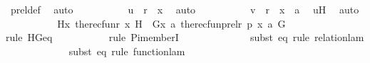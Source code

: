 \begin{isabellebody}
\ prel{\isacharunderscore}{\kern0pt}def\ \isamarkupfalse%
\ auto\ \isanewline
\ \ \ \ \ \ \isamarkupfalse%
\ \isamarkupfalse%
\ {\isachardoublequoteopen}u\ {\isasymin}\ r\ {\isacharminus}{\kern0pt}{\isacharbackquote}{\kern0pt}{\isacharbackquote}{\kern0pt}\ {\isacharbraceleft}{\kern0pt}x{\isacharbraceright}{\kern0pt}{\isachardoublequoteclose}\ \isamarkupfalse%
\ auto\ \isanewline
\ \ \ \ \ \ \isamarkupfalse%
\ \isamarkupfalse%
\ {\isachardoublequoteopen}v\ {\isasymin}\ r\ {\isacharminus}{\kern0pt}{\isacharbackquote}{\kern0pt}{\isacharbackquote}{\kern0pt}\ {\isacharbraceleft}{\kern0pt}x{\isacharbraceright}{\kern0pt}\ {\isasymtimes}\ {\isacharbraceleft}{\kern0pt}a{\isacharbraceright}{\kern0pt}{\isachardoublequoteclose}\ \isamarkupfalse%
\ uH\ \isamarkupfalse%
\ auto\isanewline
\ \ \ \ \isamarkupfalse%
\isanewline
\isanewline
\ \ \ \ \isamarkupfalse%
\ {\isachardoublequoteopen}H{\isacharparenleft}{\kern0pt}x{\isacharcomma}{\kern0pt}\ the{\isacharunderscore}{\kern0pt}recfun{\isacharparenleft}{\kern0pt}r{\isacharcomma}{\kern0pt}\ x{\isacharcomma}{\kern0pt}\ H{\isacharparenright}{\kern0pt}{\isacharparenright}{\kern0pt}\ {\isacharequal}{\kern0pt}\ G{\isacharparenleft}{\kern0pt}{\isacharless}{\kern0pt}x{\isacharcomma}{\kern0pt}\ a{\isachargreater}{\kern0pt}{\isacharcomma}{\kern0pt}\ the{\isacharunderscore}{\kern0pt}recfun{\isacharparenleft}{\kern0pt}prel{\isacharparenleft}{\kern0pt}r{\isacharcomma}{\kern0pt}\ p{\isacharparenright}{\kern0pt}{\isacharcomma}{\kern0pt}\ {\isacharless}{\kern0pt}x{\isacharcomma}{\kern0pt}\ a{\isachargreater}{\kern0pt}{\isacharcomma}{\kern0pt}\ G{\isacharparenright}{\kern0pt}{\isacharparenright}{\kern0pt}{\isachardoublequoteclose}\ \isanewline
\ \ \ \ \ \ \isamarkupfalse%
{\isacharparenleft}{\kern0pt}rule\ HGeq{\isacharparenright}{\kern0pt}\isanewline
\ \ \ \ \ \ \ \ \ \ \isamarkupfalse%
{\isacharparenleft}{\kern0pt}rule\ Pi{\isacharunderscore}{\kern0pt}memberI{\isacharparenright}{\kern0pt}\isanewline
\ \ \ \ \ \ \ \ \ \ \ \ \ \isamarkupfalse%
{\isacharparenleft}{\kern0pt}subst\ eq{}{\isacharcomma}{\kern0pt}\ rule\ relation{\isacharunderscore}{\kern0pt}lam{\isacharparenright}{\kern0pt}\isanewline
\ \ \ \ \ \ \ \ \ \ \ \ \isamarkupfalse%
{\isacharparenleft}{\kern0pt}subst\ eq{}{\isacharcomma}{\kern0pt}\ rule\ function{\isacharunderscore}{\kern0pt}lam{\isacharparenright}{\kern0pt}\isanewline

\end{isabellebody}
